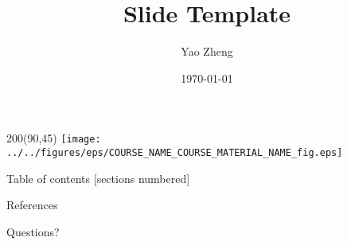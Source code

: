 \documentclass[10pt]{beamer}
\title{Slide Template}
\date{\today}
\author{Yao Zheng}
\institute{Virginia Tech}
\begin{document}
\begin{frame}
   \titlepage
   \begin{textblock}{200}(90,45)
    \texttt{[image: ../../figures/eps/COURSE\_NAME\_COURSE\_MATERIAL\_NAME\_fig.eps]}
   \end{textblock}
\end{frame}


\begin{frame}{Table of contents}
  [sections numbered]
  \tableofcontents[hideallsubsections]
\end{frame}

\begin{frame}[allowframebreaks]{References}
\nocite{*}
\printbibliography[heading=none]
\end{frame}

\begin{frame}[standout]
\Huge{Questions?}
\end{frame}
\end{document}
